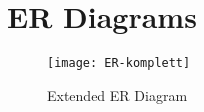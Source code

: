 \pagebreak
\section{ER Diagrams}

\begin{figure}[h]

\begin{minipage}{14cm}
\centerline{\texttt{[image: ER-komplett]}}

\caption{Extended ER Diagram}
\end{minipage}
\end{figure}

\noindent
